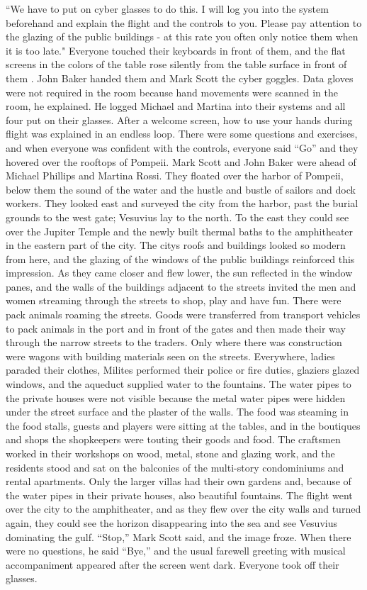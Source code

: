 \documentclass[
]{article}
\begin{document}
``We have to put on cyber glasses to do this. I will log you into the
system beforehand and explain the flight and the controls to you. Please
pay attention to the glazing of the public buildings - at this rate you
often only notice them when it is too late." Everyone touched their
keyboards in front of them, and the flat screens in the colors of the
table rose silently from the table surface in front of them . John Baker
handed them and Mark Scott the cyber goggles. Data gloves were not
required in the room because hand movements were scanned in the room, he
explained. He logged Michael and Martina into their systems and all four
put on their glasses. After a welcome screen, how to use your hands
during flight was explained in an endless loop. There were some
questions and exercises, and when everyone was confident with the
controls, everyone said ``Go'' and they hovered over the rooftops of
Pompeii. Mark Scott and John Baker were ahead of Michael Phillips and
Martina Rossi. They floated over the harbor of Pompeii, below them the
sound of the water and the hustle and bustle of sailors and dock
workers. They looked east and surveyed the city from the harbor, past
the burial grounds to the west gate; Vesuvius lay to the north. To the
east they could see over the Jupiter Temple and the newly built thermal
baths to the amphitheater in the eastern part of the city. The
city\textquotesingle s roofs and buildings looked so modern from here,
and the glazing of the windows of the public buildings reinforced this
impression. As they came closer and flew lower, the sun reflected in the
window panes, and the walls of the buildings adjacent to the streets
invited the men and women streaming through the streets to shop, play
and have fun. There were pack animals roaming the streets. Goods were
transferred from transport vehicles to pack animals in the port and in
front of the gates and then made their way through the narrow streets to
the traders. Only where there was construction were wagons with building
materials seen on the streets. Everywhere, ladies paraded their clothes,
Milites performed their police or fire duties, glaziers glazed windows,
and the aqueduct supplied water to the fountains. The water pipes to the
private houses were not visible because the metal water pipes were
hidden under the street surface and the plaster of the walls. The food
was steaming in the food stalls, guests and players were sitting at the
tables, and in the boutiques and shops the shopkeepers were touting
their goods and food. The craftsmen worked in their workshops on wood,
metal, stone and glazing work, and the residents stood and sat on the
balconies of the multi-story condominiums and rental apartments. Only
the larger villas had their own gardens and, because of the water pipes
in their private houses, also beautiful fountains. The flight went over
the city to the amphitheater, and as they flew over the city walls and
turned again, they could see the horizon disappearing into the sea and
see Vesuvius dominating the gulf. ``Stop,'' Mark Scott said, and the
image froze. When there were no questions, he said ``Bye,'' and the
usual farewell greeting with musical accompaniment appeared after the
screen went dark. Everyone took off their glasses.
\end{document}
